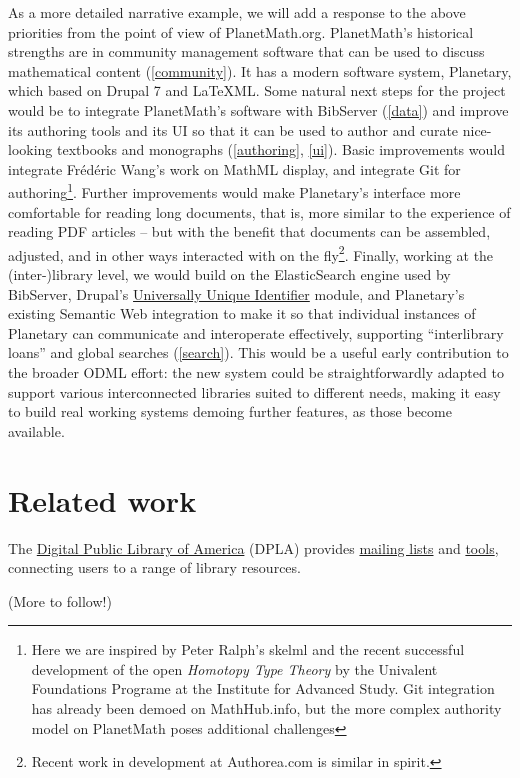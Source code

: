 \documentclass{article}
\begin{document}
As a more detailed narrative example, we will add a response to the above priorities from the point of view of PlanetMath.org.  PlanetMath's historical strengths are in community management software that can be used to discuss mathematical content (\ref{community}).  It has a modern software system, Planetary, which based on Drupal 7 and LaTeXML.  Some natural next steps for the project would be to integrate PlanetMath's software with BibServer (\ref{data}) and improve its authoring tools and its UI so that it can be used to author and curate nice-looking textbooks and monographs (\ref{authoring}, \ref{ui}).  Basic improvements would integrate Fr\'ed\'eric Wang's work on MathML display, and integrate Git for authoring\footnote{Here we are inspired by  Peter Ralph's skelml and the recent successful development of the open \emph{Homotopy Type Theory} by the Univalent Foundations Programe at the Institute for Advanced Study.  Git integration has already been demoed on MathHub.info, but the more complex authority model on PlanetMath poses additional challenges}.  Further improvements would make Planetary's interface more comfortable for reading long documents, that is, more similar to the experience of reading PDF articles -- but with the benefit that documents can be assembled, adjusted, and in other ways interacted with on the fly\footnote{Recent work in development at Authorea.com is similar in spirit.}.  Finally, working at the (inter-)library level, we would build on the ElasticSearch engine used by BibServer, Drupal's \href{https://www.drupal.org/project/uuid}{Universally Unique Identifier} module, and Planetary's existing Semantic Web integration to make it so that individual instances of Planetary can communicate and interoperate effectively, supporting ``interlibrary loans'' and global searches (\ref{search}).  This would be a useful early contribution to the broader ODML effort: the new system could be straightforwardly adapted to support various interconnected libraries suited to different needs, making it easy to build real working systems demoing further features, as those become available.

\section{Related work}

The \href{http://dp.la/info/}{Digital Public Library of America} (DPLA) provides \href{https://lists.dp.la/listinfo}{mailing lists} and \href{http://dp.la/apps}{tools}, connecting users to a range of library resources.

(More to follow!)
\end{document}
